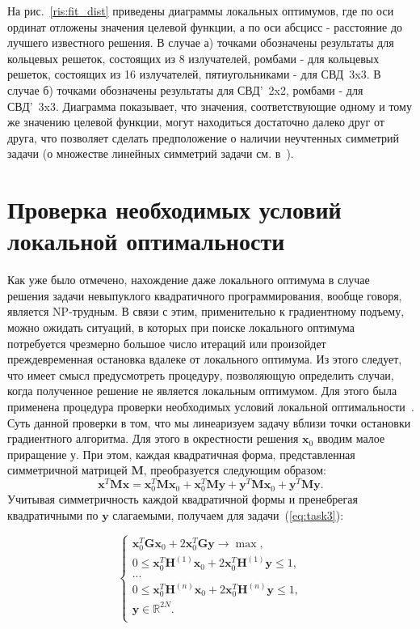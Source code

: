 На рис.~\ref{ris:fit_dist} приведены диаграммы локальных оптимумов, где по оси ординат отложены значения целевой функции, а по оси
абсцисс - расстояние до лучшего известного решения. В случае а) точками обозначены результаты для кольцевых решеток, состоящих из 8 излучателей, ромбами - для кольцевых решеток, состоящих из 16 излучателей, пятиугольниками - для СВД~3x3. В случае б) точками обозначены результаты для СВД'~2x2, ромбами - для СВД'~3x3. Диаграмма показывает, что значения, соответствующие одному и тому же значению целевой функции, могут находиться достаточно далеко друг от друга, что позволяет сделать предположение о наличии неучтенных симметрий задачи (о множестве линейных симметрий задачи см. в~\cite{yurkov:symmetry}).

\section{Проверка необходимых условий локальной оптимальности} \label{sec:loc}

Как уже было отмечено, нахождение даже локального оптимума в случае решения задачи невыпуклого квадратичного программирования, вообще говоря, является NP-трудным. В связи с этим, применительно к градиентному подъему, можно ожидать ситуаций, в которых при поиске локального оптимума потребуется чрезмерно большое число итераций или произойдет преждевременная остановка вдалеке от локального оптимума. Из этого следует, что имеет смысл предусмотреть процедуру, позволяющую определить случаи, когда полученное решение не является локальным оптимумом. Для этого была применена процедура проверки необходимых условий локальной оптимальности~\cite{murty:np}. Суть данной проверки в том, что мы линеаризуем задачу вблизи точки остановки градиентного алгоритма. Для этого в окрестности решения $\textbf{x}_0$ вводим малое приращение $\textbf{у}$. При этом, каждая квадратичная форма, представленная симметричной матрицей $\textbf{M}$, преобразуется следующим образом:
$$\textbf{x}^T\textbf{M}\textbf{x} = \textbf{x}_0^T\textbf{M}\textbf{x}_0 +
\textbf{x}_0^T\textbf{M}\textbf{y} + \textbf{y}^T\textbf{M}\textbf{x}_0 +
\textbf{y}^T\textbf{M}\textbf{y}.$$ Учитывая симметричность каждой квадратичной формы и пренебрегая квадратичными по $\textbf{y}$ слагаемыми, получаем для задачи~(\ref{eq:task3}):


\begin{equation}
    \begin{cases}
       \textbf{x}_0^T\textbf{G}\textbf{x}_0 + 2\textbf{x}_0^T\textbf{G}\textbf{y} \rightarrow \max,\\
       0 \leq \textbf{x}_0^T\textbf{H}^{(1)}\textbf{x}_0 + 2\textbf{x}_0^T\textbf{H}^{(1)}\textbf{y} \leq 1,\\
       ...\\
       0 \leq \textbf{x}_0^T\textbf{H}^{(n)}\textbf{x}_0 + 2\textbf{x}_0^T\textbf{H}^{(n)}\textbf{y} \leq 1,\\
      \textbf{y} \in \mathbb{R}^{2N}.\\
     \end{cases}
     \label{eq:task5}
\end{equation}

